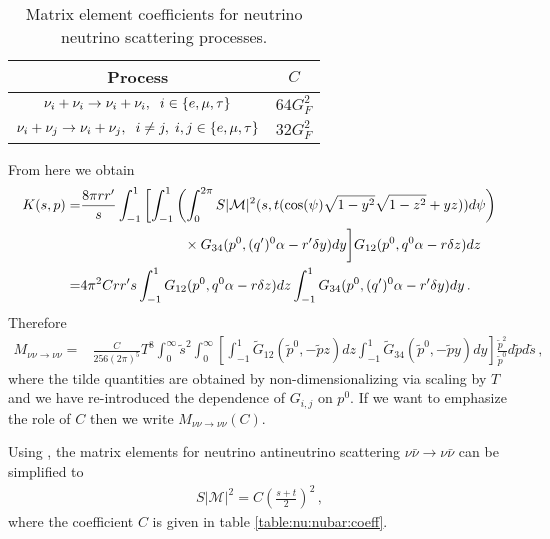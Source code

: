 \begin{table}[ht]
\centering 
\begin{tabular}{|c|c|}
\hline
Process &$C$ \\
\hline
$\nu_i+\nu_i\rightarrow\nu_i+\nu_i,\hspace{2mm} i\in\{e,\mu,\tau\}$& $64 G_F^2$\\
\hline
$\nu_i+\nu_j\rightarrow\nu_i+\nu_j,\hspace{2mm} i\neq j, \hspace{1mm} i,j\in\{e,\mu,\tau\}$& $32 G_F^2$\\
\hline
\end{tabular}
\caption{Matrix element coefficients for neutrino neutrino scattering processes.}
\label{table:nu:nu:coeff}
\end{table}
From here we obtain
\begin{align}
K(s,p)=&\frac{8\pi rr^{\prime}}{s}\int_{-1}^1 \left[\int_{-1}^1\left(\int_0^{2\pi}S|\mathcal{M}|^2 (s,t(\cos(\psi)\sqrt{1-y^2}\sqrt{1-z^2}+yz))d\psi\right)\right.\\
&\hspace{26mm}\times G_{34}(p^0,(q^{\prime})^0\alpha-r^{\prime}\delta y) dy\bigg] G_{12}(p^0,q^0\alpha-r\delta z)dz\notag\\
=& 4\pi^2 Crr^{\prime}s \int_{-1}^1 G_{12}(p^0,q^0\alpha-r\delta z)dz \int_{-1}^1G_{34}(p^0,(q^{\prime})^0\alpha-r^{\prime}\delta y) dy\,.\notag
\end{align}
Therefore
\begin{align}
M_{\nu\nu\rightarrow\nu\nu}=&\frac{C}{256(2\pi)^5 } T^8\!\!\!\int_{0}^\infty\!\!\!\tilde{s}^2\!\!\int_0^\infty  \left[\int_{-1}^1 \tilde{G}_{12}(\tilde p^0,-\tilde{p} z)dz \int_{-1}^1\tilde{G}_{34}(\tilde p^0,-\tilde{p} y) dy\right]\frac{\tilde{p}^2}{\tilde{p}^0}d\tilde{p}d\tilde{s}\,,
\end{align}
where the tilde quantities are obtained by non-dimensionalizing via scaling by $T$ and we have re-introduced the dependence of $G_{i,j}$ on $p^0$. If we want to emphasize the role of $C$ then we write $M_{\nu\nu\rightarrow\nu\nu}(C)$.

 Using , the matrix elements for neutrino antineutrino scattering $\nu\bar{\nu}\rightarrow\nu\bar{\nu}$ can be simplified to
\begin{align}
S|\mathcal{M}|^2=C\left(\frac{s+t}{2}\right)^2\,,
\end{align}
where the coefficient $C$ is given in table \ref{table:nu:nubar:coeff}.

